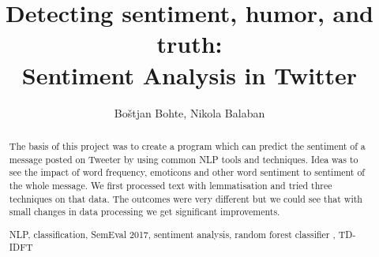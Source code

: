 \documentclass[runningheads,a4paper]{llncs}
\newcommand{\keywords}[1]{\par\addvspace\baselineskip
\noindent\keywordname\enspace\ignorespaces#1}
\begin{document}
\mainmatter  %

\title{Detecting sentiment, humor, and truth:\\Sentiment Analysis in Twitter}


%
%
\author{Bo\v{s}tjan Bohte, Nikola Balaban}%

%



%
%

\maketitle


\begin{abstract}
The basis of this project was to create a program which can predict the sentiment of a message posted on Tweeter by using common NLP tools and techniques. Idea was to see the impact of word frequency, emoticons and other word sentiment to sentiment of the whole message. We first processed text with lemmatisation and tried three techniques on that data. The outcomes were very different but we could see that with small changes in data processing we get significant improvements.

\keywords{NLP, classification, SemEval 2017, sentiment analysis, random forest classifier , TD-IDFT}

\end{abstract}
\end{document}
